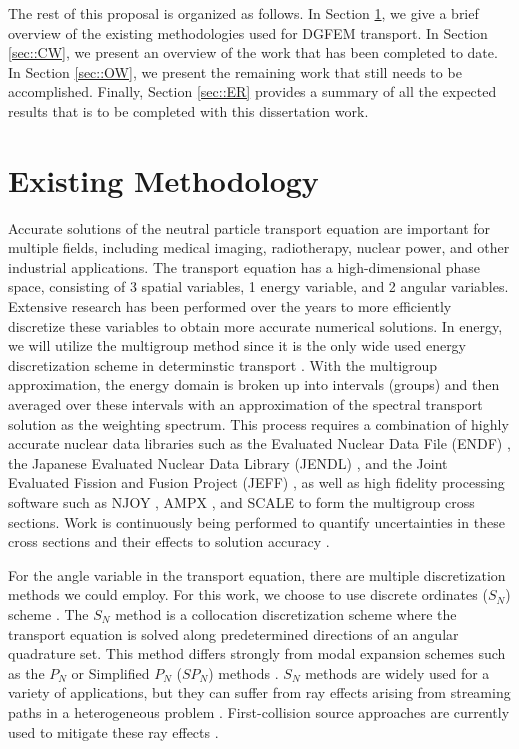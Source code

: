 \documentclass[11pt]{article}
\begin{document}
The rest of this proposal is organized as follows. In Section \ref{sec::PS}, we give a brief overview of the existing methodologies used for DGFEM transport. In Section \ref{sec::CW}, we present an overview of the work that has been completed to date. In Section \ref{sec::OW}, we present the remaining work that still needs to be accomplished. Finally, Section \ref{sec::ER} provides a summary of all the expected results that is to be completed with this dissertation work.

\section{Existing Methodology}
\label{sec::PS}
Accurate solutions of the neutral particle transport equation are important for multiple fields, including medical imaging, radiotherapy, nuclear power, and other industrial applications. The transport equation has a high-dimensional phase space, consisting of 3 spatial variables, 1 energy variable, and 2 angular variables. Extensive research has been performed over the years to more efficiently discretize these variables to obtain more accurate numerical solutions. In energy, we will utilize the multigroup method since it is the only wide used energy discretization scheme in determinstic transport \cite{duderstadt1976nuclear,bell1979nuclear}. With the multigroup approximation, the energy domain is broken up into intervals (groups) and then averaged over these intervals with an approximation of the spectral transport solution as the weighting spectrum. This process requires a combination of highly accurate nuclear data libraries such as the Evaluated Nuclear Data File (ENDF) \cite{chadwick2006endf,chadwick2011endf}, the Japanese Evaluated Nuclear Data Library (JENDL) \cite{shibata2002japanese}, and the Joint Evaluated Fission and Fusion Project (JEFF) \cite{koning2006jeff}, as well as high fidelity processing software such as NJOY \cite{macfarlane2002njoy,kahler2012njoy}, AMPX \cite{dunn2002ampx}, and SCALE \cite{bucholz1982scale} to form the multigroup cross sections. Work is continuously being performed to quantify uncertainties in these cross sections and their effects to solution accuracy \cite{aliberti2006nuclear,jessee2008cross}.

For the angle variable in the transport equation, there are multiple discretization methods we could employ. For this work, we choose to use discrete ordinates ($S_N$) scheme \cite{carlson1968computing,lewis1984computational}. The $S_N$ method is a collocation discretization scheme where the transport equation is solved along predetermined directions of an angular quadrature set. This method differs strongly from modal expansion schemes such as the $P_N$ or Simplified $P_N$ ($SP_N$) methods \cite{bell1979nuclear,gelbard1960application}. $S_N$ methods are widely used for a variety of applications, but they can suffer from ray effects arising from streaming paths in a heterogeneous problem \cite{lathrop1968ray}. First-collision source approaches are currently used to mitigate these ray effects \cite{lathrop1971remedies,morel_rayeffects}.
\end{document}
